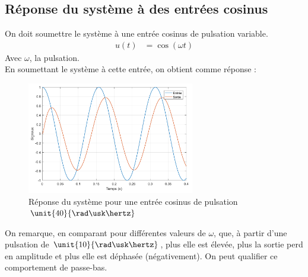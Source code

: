 \documentclass[a4paper, 12pt]{article}
\begin{document}
	\subsection{Réponse du système à des entrées cosinus}
	On doit soumettre le système à une entrée cosinus de pulsation variable.
	\begin{align}
		u(t) & = \cos \left(\omega t\right) 
	\end{align}
	Avec $\omega$, la pulsation. \\
	En soumettant le système à cette entrée, on obtient comme réponse :
	\begin{figure}[H]
		\centering
		\includegraphics[width = 0.65\textwidth]{resources/pdf/rep_cos.pdf}
		\caption{Réponse du système pour une entrée cosinus de pulsation $\unit{40}{\rad\usk\hertz}$}
	\end{figure}
	On remarque, en comparant pour différentes valeurs de $\omega$, que, à partir d'une pulsation de $\unit{10}{\rad\usk\hertz}$, plus elle est élevée, plus la sortie perd en amplitude et plus elle est déphasée (négativement). On peut qualifier ce comportement de passe-bas.
\end{document}

